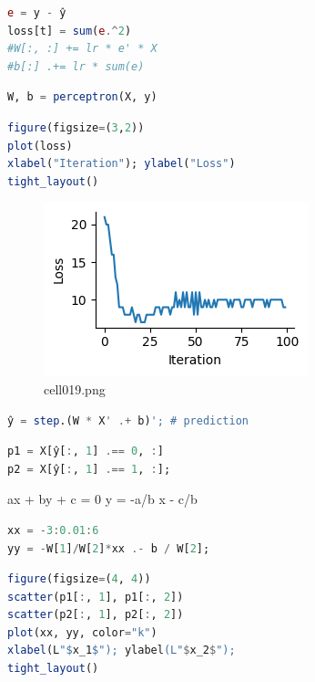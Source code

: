 \begin{lstlisting}[language=julia]
e = y - ŷ
loss[t] = sum(e.^2) 
#W[:, :] += lr * e' * X
#b[:] .+= lr * sum(e)
\end{lstlisting}
\begin{lstlisting}[language=julia]
W, b = perceptron(X, y)
\end{lstlisting}
\begin{lstlisting}[language=julia]
figure(figsize=(3,2))
plot(loss)
xlabel("Iteration"); ylabel("Loss")
tight_layout()
\end{lstlisting}
\begin{figure}[ht]
	\centering
	\includegraphics[scale=0.8, max width=\linewidth]{./fig/local-learning-rule/logistic-regression-perceptron/cell019.png}
	\caption{cell019.png}
	\label{cell019.png}
\end{figure}
\begin{lstlisting}[language=julia]
ŷ = step.(W * X' .+ b)'; # prediction
\end{lstlisting}
\begin{lstlisting}[language=julia]
p1 = X[ŷ[:, 1] .== 0, :]
p2 = X[ŷ[:, 1] .== 1, :];
\end{lstlisting}
ax + by + c = 0  
y = -a/b x - c/b
\begin{lstlisting}[language=julia]
xx = -3:0.01:6
yy = -W[1]/W[2]*xx .- b / W[2];
\end{lstlisting}
\begin{lstlisting}[language=julia]
figure(figsize=(4, 4))
scatter(p1[:, 1], p1[:, 2])
scatter(p2[:, 1], p2[:, 2])
plot(xx, yy, color="k")
xlabel(L"$x_1$"); ylabel(L"$x_2$"); 
tight_layout()
\end{lstlisting}
